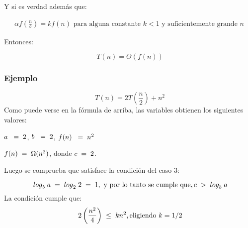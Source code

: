 \documentclass[12pt]{article} %
\begin{document}
Y si es verdad además que:

\begin{gather*}
    \label{eq:ecuacion6*}
    \alpha f\left(\frac{n}{b}\right) = kf(n) \text{ para alguna constante $k<1 $ y suficientemente grande $n$}
\end{gather*}


Entonces:

\begin{equation*}
    \label{eq:ecuacion5}
    \ T(n)=\Theta \left(f(n)\right)
\end{equation*}

\subsubsection*{Ejemplo}
\begin{equation*}
    \label{eq:ecuacion6}
    \ T(n)=2 T \left(\frac{n}{2}\right) + {n}^{2}
\end{equation*}
Como puede verse en la fórmula de arriba, las variables obtienen los siguientes valores:

$a\hspace{1mm}\hspace{1mm}=\hspace{1mm} 2$, $b\hspace{1mm}\hspace{1mm}=\hspace{1mm} 2$, $f(n)\hspace{1mm}\hspace{1mm}=\hspace{1mm} {n}^{2}$ 

$f(n)\hspace{1mm}=\hspace{1mm} \Omega ({n}^{2})$, donde  $c\hspace{1mm}=\hspace{1mm}2$.\newline

\hspace{-0.5cm}Luego se comprueba que satisface la condición del caso 3:
 
\begin{equation*}
    \label{eq:ecuacion6}
    \ {log}_{b} \hspace{1mm} a \hspace{1mm}=\hspace{1mm} {log}_{2} \hspace{1mm} 2 \hspace{1mm}=\hspace{1mm} 1, \text{ y por lo tanto se cumple que}, c\hspace{1mm}>\hspace{1mm} {log}_{b} \hspace{1mm} a
\end{equation*}
\newline
La condición cumple que:
\begin{equation*}
    \label{eq:ecuacion6}
    \ 2 \left(\frac{{n}^{2} }{4}\right)\hspace{1mm} \leq \hspace{1mm} k {n}^{2}, \text{eligiendo } k = 1 / 2
\end{equation*}
\end{document}
